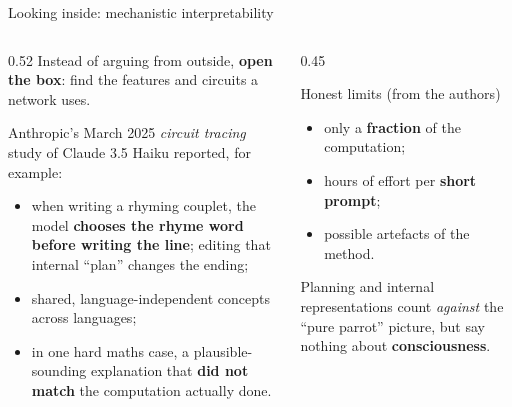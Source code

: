 \begin{frame}{Looking inside: mechanistic interpretability}
\begin{columns}[T]
\begin{column}{0.52\textwidth}
\small
Instead of arguing from outside, \textbf{open the box}: find the features and circuits a network uses.

Anthropic's March 2025 \emph{circuit tracing} study of Claude 3.5 Haiku reported, for example:
\begin{itemize}\setlength\itemsep{3pt}
\item when writing a rhyming couplet, the model \textbf{chooses the rhyme word before writing the line}; editing that internal ``plan'' changes the ending;
\item shared, language-independent concepts across languages;
\item in one hard maths case, a plausible-sounding explanation that \textbf{did not match} the computation actually done.
\end{itemize}
\end{column}
\begin{column}{0.45\textwidth}
\begin{sfig}[0.3]\end{sfig}
\begin{block}{Honest limits (from the authors)}
{\small
\begin{itemize}\setlength\itemsep{2pt}
\item only a \textbf{fraction} of the computation;
\item hours of effort per \textbf{short prompt};
\item possible artefacts of the method.
\end{itemize}}
\end{block}
{\footnotesize Planning and internal representations count \emph{against} the ``pure parrot'' picture, but say nothing about \textbf{consciousness}.}
\end{column}
\end{columns}
\end{frame}
